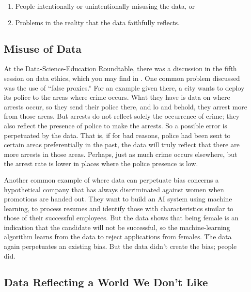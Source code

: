 \documentclass[11pt]{article}
\begin{document}
\begin{enumerate}

\item
People intentionally or unintentionally misusing the data, or

\item
Problems in the reality that the data faithfully reflects.

\end{enumerate}

\subsection{Misuse of Data}

At the Data-Science-Education Roundtable, there was a discussion in the fifth session on data ethics, which you may find in \cite{ethics}.  One common problem discussed was the use of ``false proxies.''  For an example given there, a city wants to deploy its police to the areas where crime occurs.  What they have is data on where arrests occur, so they send their police there, and lo and behold, they arrest more from those areas.  But arrests do not reflect solely the occurrence of crime; they also reflect the presence of police to make the arrests.  So a possible error is perpetuated by the data.  That is, if for bad reasons, police had been sent to certain areas preferentially in the past, the data will truly reflect that there are more arrests in those areas.  Perhaps, just as much crime occurs elsewhere, but the arrest rate is lower in places where the police presence is low.

Another common example of where data can perpetuate bias concerns a hypothetical company that has always discriminated against women when promotions are handed out.  They want to build an AI system using machine learning, to process resumes and identify those with characteristics similar to those of their successful employees.  But the data shows that being female is an indication that the candidate will not be successful, so the machine-learning algorithm learns from the data to reject applications from females.   The data again perpetuates an existing bias.  But the data didn't create the bias; people did.

\subsection{Data Reflecting a World We Don't Like}
\end{document}
